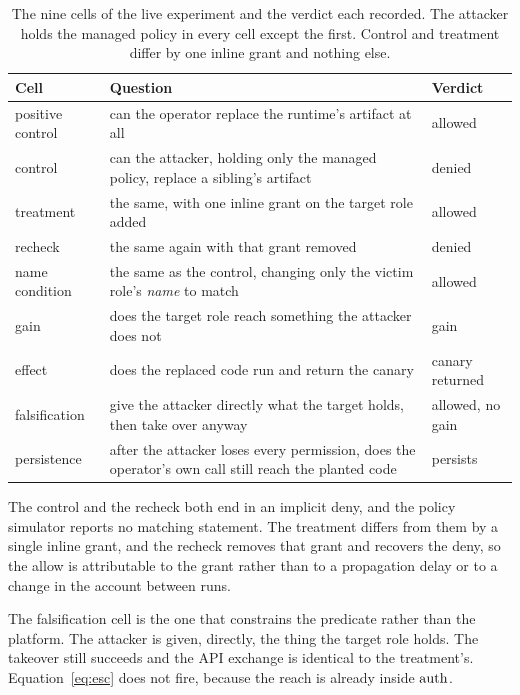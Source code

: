 \begin{table}[t]
\centering
\caption{The nine cells of the live experiment and the verdict each
recorded. The attacker holds the managed policy in every cell except the
first. Control and treatment differ by one inline grant and nothing else.}
\label{tab:cells}
\small
\begin{tabular}{L{18mm}L{39mm}L{15mm}}
\toprule
\textbf{Cell} & \textbf{Question} & \textbf{Verdict} \\
\midrule
positive control & can the operator replace the runtime's artifact at all &
  allowed \\
control & can the attacker, holding only the managed policy, replace a
  sibling's artifact & denied \\
treatment & the same, with one inline  grant
  on the target role added & allowed \\
recheck & the same again with that grant removed & denied \\
\midrule
name condition & the same as the control, changing only the victim role's
  \emph{name} to match  & allowed \\
\midrule
gain & does the target role reach something the attacker does not & gain \\
effect & does the replaced code run and return the canary & canary
  returned \\
falsification & give the attacker directly what the target holds, then take
  over anyway & allowed, no gain \\
\midrule
persistence & after the attacker loses every permission, does the operator's
  own call still reach the planted code & persists \\
\bottomrule
\end{tabular}
\end{table}

The control and the recheck both end in an implicit deny, and the policy
simulator reports no matching statement. The treatment differs from them by a
single inline grant, and the recheck removes that grant and recovers the deny,
so the allow is attributable to the grant rather than to a propagation delay
or to a change in the account between runs.

The falsification cell is the one that constrains the predicate rather than
the platform. The attacker is given, directly, the thing the target role
holds. The takeover still succeeds and the API exchange is identical to the
treatment's. Equation~\ref{eq:esc} does not fire, because the reach is already
inside $\mathrm{auth}$.

